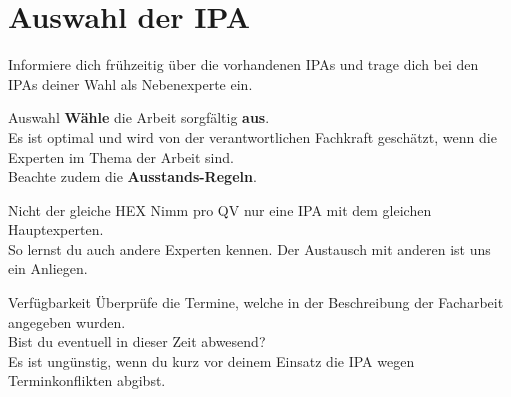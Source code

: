 \section{Auswahl der IPA}
Informiere dich frühzeitig über die vorhandenen IPAs und trage dich bei den IPAs deiner Wahl als Nebenexperte ein.

\begin{taskitemwithoutcomment}{Auswahl}
  \textbf{Wähle} die Arbeit sorgfältig \textbf{aus}.\\
  Es ist optimal und wird von der verantwortlichen Fachkraft geschätzt, wenn die Experten im Thema der Arbeit sind.\\
  Beachte zudem die \textbf{Ausstands-Regeln}.
\end{taskitemwithoutcomment}
\begin{taskitemwithoutcomment}{Nicht der gleiche HEX}
  Nimm pro QV nur eine IPA mit dem gleichen Hauptexperten.\\
  So lernst du auch andere Experten kennen. Der Austausch mit anderen ist uns ein Anliegen.
\end{taskitemwithoutcomment}
\begin{taskitem}{Verfügbarkeit}
  Überprüfe die Termine, welche in der Beschreibung der Facharbeit angegeben wurden.\\
  Bist du eventuell in dieser Zeit abwesend?\\
  Es ist ungünstig, wenn du kurz vor deinem Einsatz die IPA wegen Terminkonflikten abgibst.
\end{taskitem}